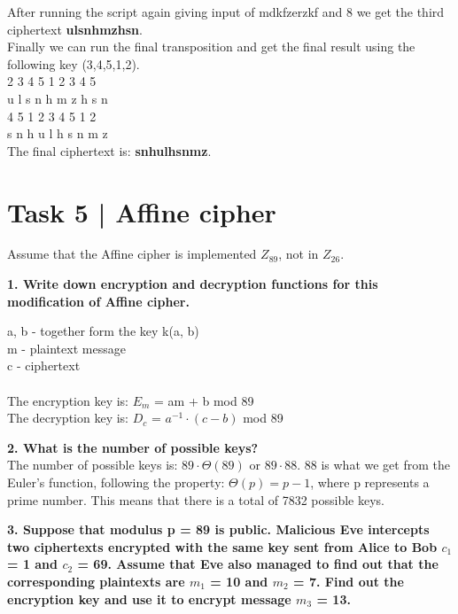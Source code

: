 \documentclass[12pt]{article}
\begin{document}
\noindent After running the script again giving input of mdkfzerzkf and 8 we get the
third ciphertext \textbf{ulsnhmzhsn}. \\

\noindent Finally we can run the final transposition and get the final result using
the following key (3,4,5,1,2). \\

  2  3  4  5  1  2  3  4  5 \\
u  l  s  n  h  m  z  h  s  n \\ 

  4  5  1  2  3  4  5  1  2 \\
s  n  h  u  l  h  s  n  m  z \\

\noindent The final ciphertext is: \textbf{snhulhsnmz}.


\section*{Task 5 | Affine cipher}

Assume that the Affine cipher is implemented $Z_{89}$, not in $Z_{26}$.
\newline

\noindent
\textbf{1. Write down encryption and decryption functions for this modification of Affine cipher.}\newline

\noindent a, b - together form the key k(a, b) \\
m - plaintext message \\
c - ciphertext \\\\
\noindent The encryption key is: $E_m$ = am + b mod 89 \\
The decryption key is: $D_c$ = $a^{-1} \cdot (c - b)$ mod 89 \pagebreak 

\noindent \textbf{2. What is the number of possible keys?}
\newline
\noindent
\\The number of possible keys is: $89 \cdot \Theta(89)$ or $89 \cdot 88$. 88 is 
what we get from the Euler's function, following the property: $\Theta(p) = p - 1$, 
where p represents a prime number. This means that there is a total of 7832 possible
keys.
\newline

\noindent \textbf{3. Suppose that modulus p = 89 is public. Malicious Eve intercepts 
two ciphertexts encrypted with the same key sent from Alice to Bob $c_1$ = 1 and
$c_2$ = 69. Assume that Eve also managed to find out that the corresponding 
plaintexts are $m_1$ = 10 and $m_2$ = 7. Find out the encryption key and use it 
to encrypt message $m_3$ = 13.}
\newline
\end{document}
